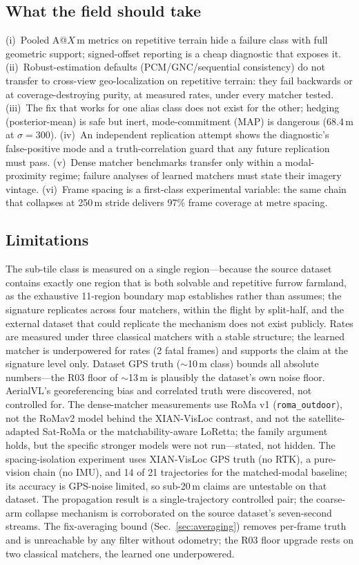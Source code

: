 \documentclass[journal]{IEEEtran}
\begin{document}
\subsection{What the field should take}
(i)~Pooled A@$X$\,m metrics on repetitive terrain hide a failure class with full geometric support; signed-offset reporting is a cheap diagnostic that exposes it. (ii)~Robust-estimation defaults (PCM/GNC/sequential consistency) do not transfer to cross-view geo-localization on repetitive terrain: they fail backwards or at coverage-destroying purity, at measured rates, under every matcher tested. (iii)~The fix that works for one alias class does not exist for the other; hedging (posterior-mean) is safe but inert, mode-commitment (MAP) is dangerous (68.4\,m at $\sigma=300$). (iv)~An independent replication attempt shows the diagnostic's false-positive mode and a truth-correlation guard that any future replication must pass. (v)~Dense matcher benchmarks transfer only within a modal-proximity regime; failure analyses of learned matchers must state their imagery vintage. (vi)~Frame spacing is a first-class experimental variable: the same chain that collapses at 250\,m stride delivers 97\% frame coverage at metre spacing.

\subsection{Limitations}
The sub-tile class is measured on a single region---because the source dataset contains exactly one region that is both solvable and repetitive furrow farmland, as the exhaustive 11-region boundary map establishes rather than assumes; the signature replicates across four matchers, within the flight by split-half, and the external dataset that could replicate the mechanism does not exist publicly. Rates are measured under three classical matchers with a stable structure; the learned matcher is underpowered for rates (2 fatal frames) and supports the claim at the signature level only. Dataset GPS truth ($\sim$10\,m class) bounds all absolute numbers---the R03 floor of $\sim$13\,m is plausibly the dataset's own noise floor. AerialVL's georeferencing bias and correlated truth were discovered, not controlled for. The dense-matcher measurements use RoMa v1 (\texttt{roma\_outdoor}), not the RoMav2 model behind the XIAN-VisLoc contrast, and not the satellite-adapted Sat-RoMa or the matchability-aware LoRetta; the family argument holds, but the specific stronger models were not run---stated, not hidden. The spacing-isolation experiment uses XIAN-VisLoc GPS truth (no RTK), a pure-vision chain (no IMU), and 14 of 21 trajectories for the matched-modal baseline; its accuracy is GPS-noise limited, so sub-20\,m claims are untestable on that dataset. The propagation result is a single-trajectory controlled pair; the coarse-arm collapse mechanism is corroborated on the source dataset's seven-second streams. The fix-averaging bound (Sec.~\ref{sec:averaging}) removes per-frame truth and is unreachable by any filter without odometry; the R03 floor upgrade rests on two classical matchers, the learned one underpowered.
\end{document}
